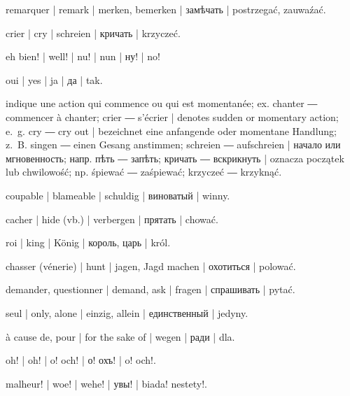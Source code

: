 \begin{ekzvocab}{1em}
 remarquer | remark | merken, bemerken | замѣчать | postrzegać, zauwaźać.

 crier | cry | schreien | кричать | krzyczeć.

 eh bien! | well! | nu! | nun | ну! | no!

 oui | yes | ja | да | tak.

 indique une action qui commence ou qui est momentanée; ex.  chanter ―  commencer à chanter;  crier ―  s’écrier | denotes sudden or momentary action; e.~g.  cry ―  cry out | bezeichnet eine anfangende oder momentane Handlung; z.~B.  singen ―  einen Gesang anstimmen;  schreien ―  aufschreien | начало или мгновенность; напр.  пѣть ―  запѣть;  кричать ―  вскрикнуть | oznacza początek lub chwilowość; np.  śpiewać ―  zaśpiewać;  krzyczeć ―  krzyknąć.

 coupable | blameable | schuldig | виноватый | winny.

 cacher | hide (vb.) | verbergen | прятать | chować.

 roi | king | König | король, царь | król.

 chasser (vénerie) | hunt | jagen, Jagd machen | охотиться | polować.

 demander, questionner | demand, ask | fragen | спрашивать | pytać.

 seul | only, alone | einzig, allein | единственный | jedyny.

 à cause de, pour | for the sake of | wegen | ради | dla.

 oh! | oh! | o! och! | о! охъ! | o! och!.

 malheur! | woe! | wehe! | увы! | biada! nestety!.

\end{ekzvocab}


